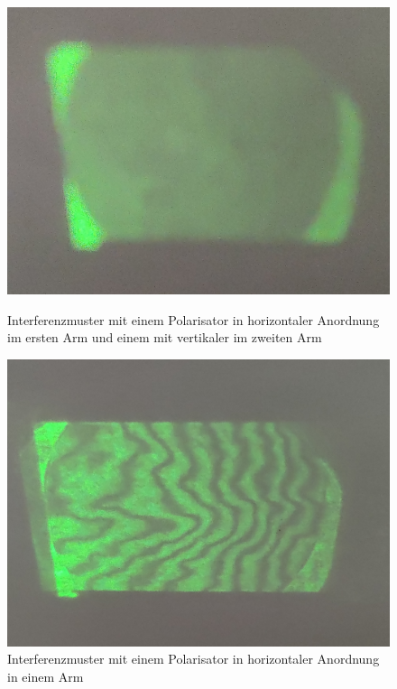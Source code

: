 \documentclass[ngerman]{scrartcl}
\begin{document}
\setcapindent{0pt}
\begin{figure}[H]
    \centering
    \begin{minipage}[t]{0.45\linewidth}
        \centering
        \includegraphics[width=\linewidth]{fig/Arago_mixed Detail.jpg}
        \caption{Interferenzmuster mit einem Polarisator in horizontaler Anordnung im ersten Arm und einem mit vertikaler im zweiten Arm}
        \label{fig:michelson_pol_mixed}
    \end{minipage}%
    \hspace*{\fill}
    \begin{minipage}[t]{0.45\linewidth}
        \centering
        \includegraphics[width=\linewidth]{fig/Arago_horizontal_detail.jpg}
        \caption{Interferenzmuster mit einem Polarisator in horizontaler Anordnung in einem Arm}
        \label{fig:michelson_pol_1_horizontal}
    \end{minipage}
\end{figure}
\setcaphanging
\end{document}
